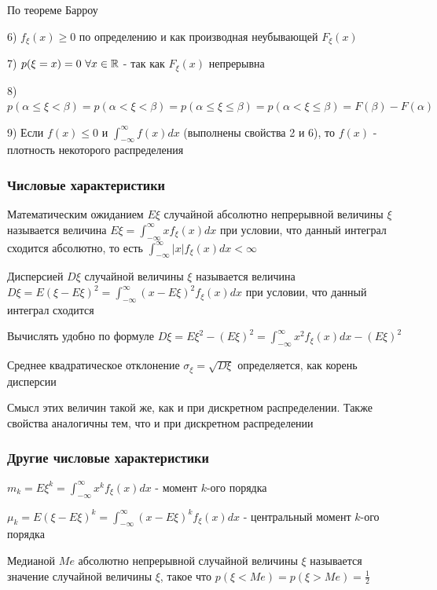 \documentclass[12pt]{article}
\begin{document}
    \begin{MyProof}
        По теореме Барроу
    \end{MyProof}

    6) $f_\xi(x) \geq 0$ по определению и как производная неубывающей $F_\xi(x)$

    7) $p(\xi = x) = 0 \ \forall x \in \mathbb{R}$ - так как $F_\xi(x)$ непрерывна

    8) $p(\alpha \leq \xi < \beta) = p(\alpha < \xi < \beta) = p(\alpha \leq \xi \leq \beta) = p(\alpha < \xi \leq \beta) = F(\beta) - F(\alpha)$

    9) \Ths Если $f(x) \leq 0$ и $\int_{-\infty}^{\infty} f(x)dx$ (выполнены свойства 2 и 6), то $f(x)$ - плотность некоторого распределения

    \subsubsection{Числовые характеристики}

    \Def Математическим ожиданием $E\xi$ случайной абсолютно непрерывной величины $\xi$ называется величина $E\xi = \int_{-\infty}^{\infty} xf_\xi(x) dx$ 
    при условии, что данный интеграл сходится абсолютно, то есть $\int_{-\infty}^\infty |x|f_\xi(x)dx < \infty$

    \Def Дисперсией $D\xi$ случайной величины $\xi$ называется величина $D\xi = E(\xi - E\xi)^2 = \int_{-\infty}^\infty (x - E\xi)^2 f_\xi(x) dx$ при условии,
    что данный интеграл сходится

    \Notas Вычислять удобно по формуле $D\xi = E\xi^2 - (E\xi)^2 = \int_{-\infty}^\infty x^2 f_\xi(x)dx - (E\xi)^2$

    \Def Среднее квадратическое отклонение $\sigma_\xi = \sqrt{D\xi}$ определяется, как корень дисперсии

    Смысл этих величин такой же, как и при дискретном распределении. Также свойства аналогичны тем, что и при дискретном распределении

    \subsubsection{Другие числовые характеристики}

    $m_k = E\xi^k = \int_{-\infty}^\infty x^k f_\xi(x)dx$ - момент $k$-ого порядка

    $\mu_k = E(\xi - E\xi)^k = \int_{-\infty}^\infty (x - E\xi)^k f_\xi(x)dx$ - центральный момент $k$-ого порядка

    \Def Медианой $Me$ абсолютно непрерывной случайной величины $\xi$ называется значение случайной величины $\xi$, такое что $p(\xi < Me) = p(\xi > Me) = \frac{1}{2}$
    
\end{document}
